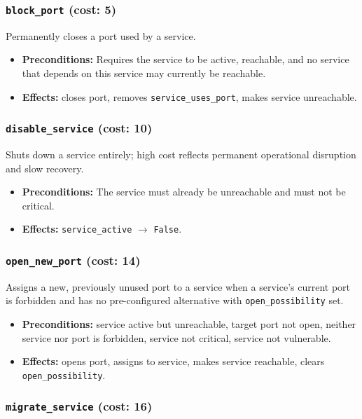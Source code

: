 \documentclass[12pt,a4paper]{article}
\begin{document}
	\subsubsection{\texttt{block\_port} \quad (cost: 5)}
	
	Permanently closes a port used by a service.
	\begin{itemize}[leftmargin=1.5em]
		\item \textbf{Preconditions:} Requires the service to be active, reachable, and no service that depends on this service may currently be reachable.
		\item \textbf{Effects:} closes port, removes \texttt{service\_uses\_port}, makes service unreachable.
	\end{itemize}
	
	\subsubsection{\texttt{disable\_service} \quad (cost: 10)}
	
	Shuts down a service entirely; high cost reflects permanent operational disruption and slow recovery.
	\begin{itemize}[leftmargin=1.5em]
		\item \textbf{Preconditions:} The service must already be unreachable and must not be critical.
		\item \textbf{Effects:} \texttt{service\_active} $\rightarrow$ \texttt{False}.
	\end{itemize}
	
	\subsubsection{\texttt{open\_new\_port} \quad (cost: 14)}
	
	Assigns a new, previously unused port to a service when a service's current port is forbidden and
	has no pre-configured alternative with \texttt{open\_possibility} set.
	\begin{itemize}[leftmargin=1.5em]
		\item \textbf{Preconditions:} service active but unreachable, target port not open, neither service nor port is forbidden, service not critical, service not vulnerable.
		\item \textbf{Effects:} opens port, assigns to service, makes service reachable, clears \texttt{open\_possibility}.
	\end{itemize}
	
	\subsubsection{\texttt{migrate\_service} \quad (cost: 16)}
	
\end{document}

